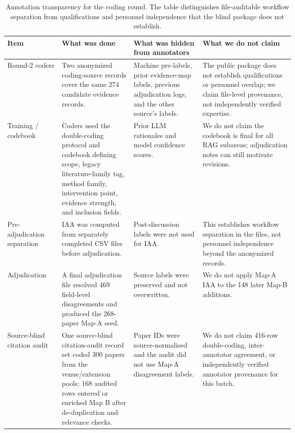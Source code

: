 \begin{table}[t]
\centering
\scriptsize
\renewcommand{\arraystretch}{0.9}
\begin{tabularx}{\linewidth}{>{\raggedright\arraybackslash}p{0.19\linewidth}>{\raggedright\arraybackslash}p{0.25\linewidth}>{\raggedright\arraybackslash}p{0.24\linewidth}X}
\toprule
\textbf{Item} & \textbf{What was done} & \textbf{What was hidden from annotators} & \textbf{What we do not claim} \\
\midrule
Round-2 coders & Two anonymized coding-source records cover the same 274 candidate evidence records. & Machine pre-labels, prior evidence-map labels, previous adjudication logs, and the other source's labels. & The public package does not establish qualifications or personnel overlap; we claim file-level provenance, not independently verified expertise. \\
Training / codebook & Coders used the double-coding protocol and codebook defining scope, legacy literature-family tag, method family, intervention point, evidence strength, and inclusion fields. & Prior LLM rationales and model confidence scores. & We do not claim the codebook is final for all RAG subareas; adjudication notes can still motivate revisions. \\
Pre-adjudication separation & IAA was computed from separately completed CSV files before adjudication. & Post-discussion labels were not used for IAA. & This establishes workflow separation in the files, not personnel independence beyond the anonymized records. \\
Adjudication & A final adjudication file resolved 469 field-level disagreements and produced the 268-paper Map-A seed. & Source labels were preserved and not overwritten. & We do not apply Map-A IAA to the 148 later Map-B additions. \\
Source-blind citation audit & One source-blind citation-audit record set coded 300 papers from the venue/extension pools; 168 audited rows entered or enriched Map B after de-duplication and relevance checks. & Paper IDs were source-normalised and the audit did not use Map-A disagreement labels. & We do not claim 416-row double-coding, inter-annotator agreement, or independently verified annotator provenance for this batch. \\
\bottomrule
\end{tabularx}
\caption{Annotation transparency for the coding round. The table distinguishes file-auditable workflow separation from qualifications and personnel independence that the blind package does not establish.}
\label{tab:annotation-transparency}
\end{table}
